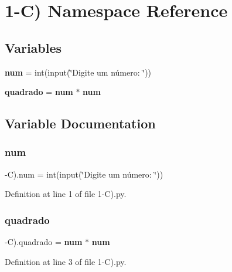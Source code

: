 \section{1-\/C) Namespace Reference}
\label{namespace1-_c_08}
\subsection*{Variables}
\begin{DoxyCompactItemize}
\item 
\textbf{ num} = int(input(\char`\"{}Digite um número\+: \char`\"{}))
\item 
\textbf{ quadrado} = \textbf{ num} $\ast$ \textbf{ num}
\end{DoxyCompactItemize}


\subsection{Variable Documentation}
\mbox{\label{namespace1-_c_08_ae5661cbab7bf75af09f53b056b3825b0}} 
\subsubsection{num}
{\footnotesize{}-\/C).num = int(input(\char`\"{}Digite um número\+: \char`\"{}))}



Definition at line 1 of file 1-\/\+C).\+py.

\mbox{\label{namespace1-_c_08_a88ccdfeb1427bdb37821c7465b8c5552}} 
\subsubsection{quadrado}
{\footnotesize{}-\/C).quadrado = \textbf{ num} $\ast$ \textbf{ num}}



Definition at line 3 of file 1-\/\+C).\+py.

